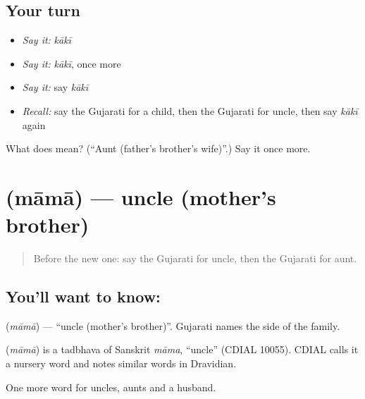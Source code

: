 \subsection*{Your turn}
\begin{itemize}
\raggedright
  \item \emph{Say it:} \emph{kākī}
  \item \emph{Say it:} \emph{kākī}, once more
  \item \emph{Say it:} say \emph{kākī}
  \item \emph{Recall:} say the Gujarati for a child, then the Gujarati for uncle, then say \emph{kākī} again
\end{itemize}

\begin{tcolorbox}[breakable,colback=teal!4,colframe=teal!35!black,title={Before you move on}]
What does  mean? (\textquotedblleft{}Aunt (father's brother's wife)\textquotedblright{}.) Say it once more.
\end{tcolorbox}
\section[\texorpdfstring{\gu{મામા} (māmā)}{મામા (māmā)}]{ (māmā) — uncle (mother's brother)}

\label{lesson:GU-C52-mama}



\begin{quote}
Before the new one: say the Gujarati for uncle, then the Gujarati for aunt.
\end{quote}

\subsection*{You'll want to know: }
\textbf{} (\emph{māmā}) — \textquotedblleft{}uncle (mother's brother)\textquotedblright{}. Gujarati names the side of the family.

\begin{cousinweb}
\textbf{} (\emph{māmā}) is a tadbhava of Sanskrit \emph{māma}, \textquotedblleft{}uncle\textquotedblright{} (CDIAL 10055). CDIAL calls it a nursery word and notes similar words in Dravidian.
\end{cousinweb}

\begin{grammarlens}[title={What you've built}]
One more word for uncles, aunts and a husband.
\end{grammarlens}

